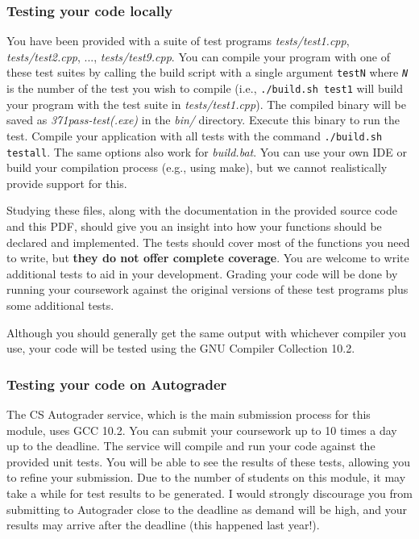 \documentclass[a4paper]{article}
\begin{document}
\subsubsection*{Testing your code locally}
You have been provided with a suite of test programs \emph{tests/test1.cpp}, \emph{tests/test2.cpp}, ..., \emph{tests/test9.cpp}. You can compile your program with one of these test suites by calling the build script with a single argument \texttt{testN} where \emph{\texttt{N}} is the number of the test you wish to compile (i.e., \texttt{./build.sh test1} will build your program with the test suite in \emph{tests/test1.cpp}). The compiled binary will be saved as \emph{371pass-test(.exe)} in the \emph{bin/} directory. Execute this binary to run the test. Compile your application with all tests with the command \texttt{./build.sh testall}. The same options also work for \emph{build.bat}. You can use your own IDE or build your compilation process (e.g., using make), but we cannot realistically provide support for this.

Studying these files, along with the documentation in the provided source code and this PDF, should give you an insight into how your functions should be declared and implemented. The tests should cover most of the functions you need to write, but \textbf{they do not offer complete coverage}. You are welcome to write additional tests to aid in your development. Grading your code will be done by running your coursework against the original versions of these test programs plus some additional tests.

Although you should generally get the same output with whichever compiler you use, your code will be tested using the GNU Compiler Collection 10.2.

\subsubsection*{Testing your code on Autograder}
The CS Autograder service, which is the main submission process for this module, uses GCC 10.2. You can submit your coursework up to 10 times a day up to the deadline. The service will compile and run your code against the provided unit tests. You will be able to see the results of these tests, allowing you to refine your submission. Due to the number of students on this module, it may take a while for test results to be generated. I would strongly discourage you from submitting to Autograder close to the deadline as demand will be high, and your results may arrive after the deadline (this happened last year!).
\end{document}
